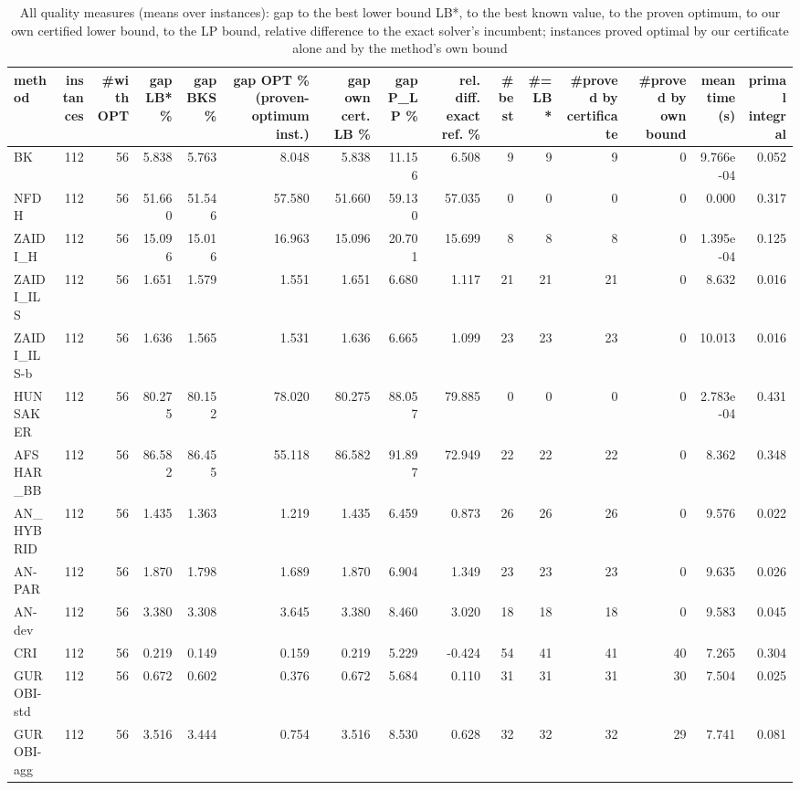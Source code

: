 \begin{table}[htbp]
\centering
\small
\caption{All quality measures (means over instances): gap to the best lower bound LB*, to the best known value, to the proven optimum, to our own certified lower bound, to the LP bound, relative difference to the exact solver's incumbent; instances proved optimal by our certificate alone and by the method's own bound}
\label{tab:E10a_state_of_the_art_b10_all_metrics}
\begin{tabular}{lrrrrrrrrrrrrrr}
\toprule
method & instances & \#with OPT & gap LB* \% & gap BKS \% & gap OPT \% (proven-optimum inst.) & gap own cert. LB \% & gap P\_LP \% & rel. diff. exact ref. \% & \#best & \#= LB* & \#proved by certificate & \#proved by own bound & mean time (s) & primal integral \\
\midrule
BK & 112 & 56 & 5.838 & 5.763 & 8.048 & 5.838 & 11.156 & 6.508 & 9 & 9 & 9 & 0 & 9.766e-04 & 0.052 \\
NFDH & 112 & 56 & 51.660 & 51.546 & 57.580 & 51.660 & 59.130 & 57.035 & 0 & 0 & 0 & 0 & 0.000 & 0.317 \\
ZAIDI\_H & 112 & 56 & 15.096 & 15.016 & 16.963 & 15.096 & 20.701 & 15.699 & 8 & 8 & 8 & 0 & 1.395e-04 & 0.125 \\
ZAIDI\_ILS & 112 & 56 & 1.651 & 1.579 & 1.551 & 1.651 & 6.680 & 1.117 & 21 & 21 & 21 & 0 & 8.632 & 0.016 \\
ZAIDI\_ILS-b & 112 & 56 & 1.636 & 1.565 & 1.531 & 1.636 & 6.665 & 1.099 & 23 & 23 & 23 & 0 & 10.013 & 0.016 \\
HUNSAKER & 112 & 56 & 80.275 & 80.152 & 78.020 & 80.275 & 88.057 & 79.885 & 0 & 0 & 0 & 0 & 2.783e-04 & 0.431 \\
AFSHAR\_BB & 112 & 56 & 86.582 & 86.455 & 55.118 & 86.582 & 91.897 & 72.949 & 22 & 22 & 22 & 0 & 8.362 & 0.348 \\
AN\_HYBRID & 112 & 56 & 1.435 & 1.363 & 1.219 & 1.435 & 6.459 & 0.873 & 26 & 26 & 26 & 0 & 9.576 & 0.022 \\
AN-PAR & 112 & 56 & 1.870 & 1.798 & 1.689 & 1.870 & 6.904 & 1.349 & 23 & 23 & 23 & 0 & 9.635 & 0.026 \\
AN-dev & 112 & 56 & 3.380 & 3.308 & 3.645 & 3.380 & 8.460 & 3.020 & 18 & 18 & 18 & 0 & 9.583 & 0.045 \\
CRI & 112 & 56 & 0.219 & 0.149 & 0.159 & 0.219 & 5.229 & -0.424 & 54 & 41 & 41 & 40 & 7.265 & 0.304 \\
GUROBI-std & 112 & 56 & 0.672 & 0.602 & 0.376 & 0.672 & 5.684 & 0.110 & 31 & 31 & 31 & 30 & 7.504 & 0.025 \\
GUROBI-agg & 112 & 56 & 3.516 & 3.444 & 0.754 & 3.516 & 8.530 & 0.628 & 32 & 32 & 32 & 29 & 7.741 & 0.081 \\
\bottomrule
\end{tabular}
\end{table}
